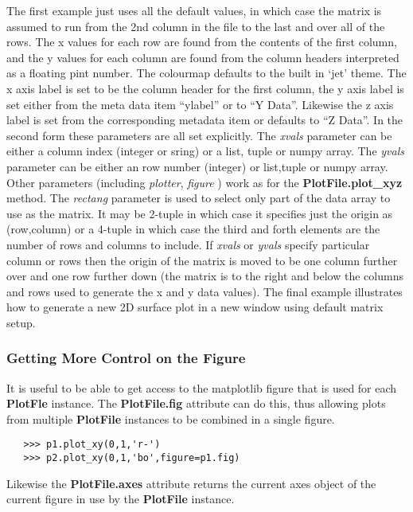 \documentclass[a4paper,11pt]{scrartcl}
\begin{document}
 The first example just uses all the default values, in which case the matrix is assumed to run from the 2nd column in the file to the last and over all of the rows. The x values for each row are found from the contents of the first column, and the y values for each column are found from the column headers interpreted as a floating pint number. The colourmap defaults to the built in `jet' theme. The x axis label is set to be the column header for the first column, the y axis label is set either from the meta data item ``ylabel'' or to ``Y Data''. Likewise the z axis label is set from the corresponding metadata item or defaults to ``Z Data''. In the second form these parameters are all set explicitly. The \textit{xvals} parameter can be either a column index (integer or sring) or a list, tuple or numpy array. The \textit{yvals} parameter can be either an row number (integer) or list,tuple or numpy array. Other parameters (including \textit{plotter}, \textit{figure} \etc) work as for the \textbf{PlotFile.plot\_xyz} method. The \textit{rectang} parameter is used to select only part of the data array to use as the matrix. It may be 2-tuple in which case it specifies just the origin as (row,column) or a 4-tuple in which case the third and forth elements are the number of rows and columns to include. If \textit{xvals} or \textit{yvals} specify particular column or rows then the origin of the matrix is moved to be one column further over and one row further down (\ie the matrix is to the right and below the columns and rows used to generate the x and y data values). The final example illustrates how to generate a new 2D surface plot in a new window using default matrix setup.

 \subsubsection{Getting More Control on the Figure}

 It is useful to be able to get access to the matplotlib figure that is used for each \textbf{PlotFle} instance. The \textbf{PlotFile.fig} attribute can do this, thus allowing plots from multiple \textbf{PlotFile} instances to be combined in a single figure.

 \begin{verbatim}
   >>> p1.plot_xy(0,1,'r-')
   >>> p2.plot_xy(0,1,'bo',figure=p1.fig)
 \end{verbatim}

 Likewise the \textbf{PlotFile.axes} attribute returns the current axes object of the current figure in use by the \textbf{PlotFile} instance.
\end{document}
